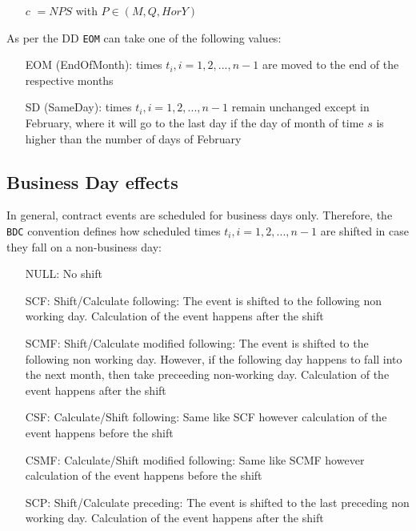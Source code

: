 \documentclass[9pt,oneside]{amsart}
\newcommand{\attr}[1]{\texttt{#1}}
\begin{document}
\begin{multicols}{2}
\begin{itemize}
	\item[$c$] $=NPS$ with $P\in(M, Q, H or Y)$
\end{itemize}

As per the DD \attr{EOM} can take one of the following values:
\begin{itemize}
	\item[EOM] (EndOfMonth): times $t_i,i=1,2,...,n-1$ are moved to the end of the respective months

	\item[SD] (SameDay): times $t_i,i=1,2,...,n-1$ remain unchanged except in February, where it will go to the last day if the day of month of time $s$ is higher than the number of days of February
\end{itemize}


\subsection{Business Day effects}

In general, contract events are scheduled for business days only. Therefore, the \attr{BDC} convention defines how scheduled times $t_i,i=1,2,...,n-1$ are shifted in case they fall on a non-business day:

\begin{itemize}
	\item[NULL:] No shift

	\item[SCF:] Shift/Calculate following: The event is shifted to the following non working day. Calculation of the event happens after the shift

	\item[SCMF:] Shift/Calculate modified following: The event is shifted to the following non working day. However, if the following day happens to fall into the next month, then take preceeding non-working day. Calculation of the event happens after the shift

	\item[CSF:] Calculate/Shift following: Same like SCF however calculation of the event happens before the shift

	\item[CSMF:] Calculate/Shift modified following: Same like SCMF however calculation of the event happens before the shift

	\item[SCP:] Shift/Calculate preceding: The event is shifted to the last preceding non working day. Calculation of the event happens after the shift


\end{itemize}
\end{multicols}
\end{document}
